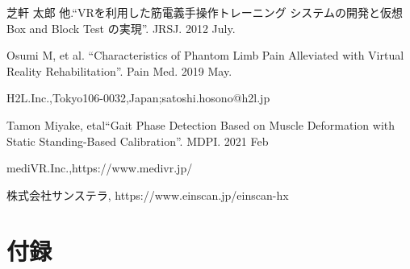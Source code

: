\documentclass{ltjsreport}
\begin{document}
\begin{thebibliography}{99}

	芝軒 太郎 他.``VRを利用した筋電義手操作トレーニング
	システムの開発と仮想 Box and Block Test の実現''.
	JRSJ. 2012 July.

	Osumi M, et al.
	``Characteristics of Phantom Limb Pain Alleviated
	with Virtual Reality Rehabilitation''.
	Pain Med. 2019 May.

	H2L.Inc.,Tokyo106-0032,Japan;satoshi.hosono@h2l.jp

	Tamon Miyake, etal``Gait Phase Detection Based on Muscle Deformation
	with Static Standing-Based Calibration''.
	MDPI. 2021 Feb

	mediVR.Inc.,https://www.medivr.jp/

	株式会社サンステラ, https://www.einscan.jp/einscan-hx



\end{thebibliography}
\chapter*{付録}
\setcounter{page}{1}
\end{document}
